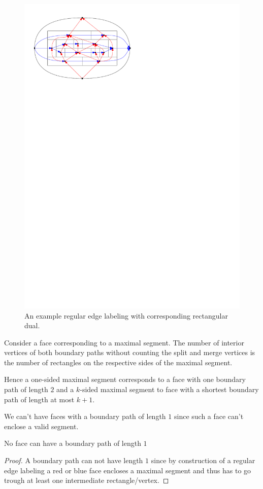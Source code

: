     \begin{figure}[t]
      \centering
      \includegraphics[scale=1]{rectangularDuals/img/relSegmentFaceRescale}
      \caption{An example regular edge labeling with corresponding rectangular dual.}
      \label{fig:rect:relSegmentFace}
    \end{figure}

    Consider a face corresponding to a maximal segment.
    The number of interior vertices of both boundary paths without counting the split and merge vertices is the number of rectangles on the respective sides of the maximal segment.

    Hence a one-sided maximal segment corresponds to a face with one boundary path of length $2$  and a $k$-sided maximal segment to face with a shortest boundary path of length at most $k+1$.

    We can't have faces with a boundary path of length $1$ since such a face can't enclose a valid segment.

    \begin{lemma}
      \label{lm:rel:noBpOfLength1}
      No face can have a boundary path of length $1$
    \end{lemma}
    \begin{proof}
      A boundary path can not have length $1$ since by construction of a regular edge labeling a red or blue face encloses a maximal segment and thus has to go trough at least one intermediate rectangle/vertex.
    \end{proof}
